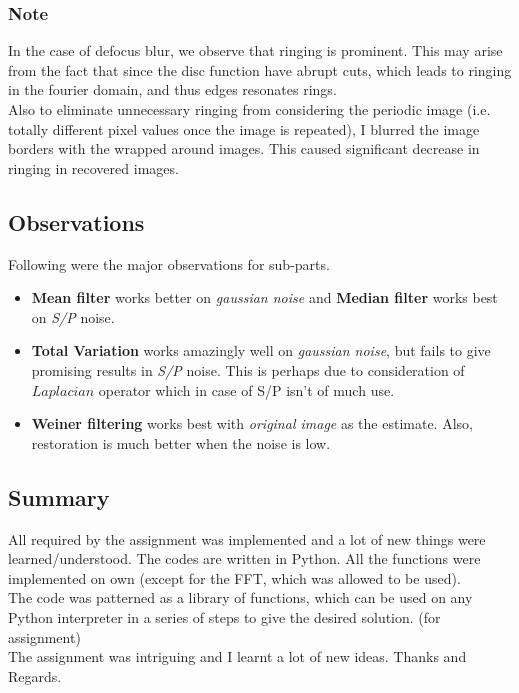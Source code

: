 \documentclass{article}
\begin{document}
    \subsubsection*{Note}
    In the case of defocus blur, we observe that ringing is prominent. This may arise from the fact that since the disc function have abrupt cuts, which leads to ringing in the fourier domain, and thus edges resonates rings.\\
    Also to eliminate unnecessary ringing from considering the periodic image (i.e. totally different pixel values once the image is repeated), I blurred the image borders with the wrapped around images. This caused significant decrease in ringing in recovered images.
    \pagebreak

    \subsection*{Observations}
    Following were the major observations for sub-parts.
    \begin{itemize}[topsep=0cm]
        \item \textbf{Mean filter} works better on \textit{gaussian noise} and \textbf{Median filter} works best on \textit{S/P} noise.
        \item \textbf{Total Variation} works amazingly well on \textit{gaussian noise}, but fails to give promising results in \textit{S/P} noise. This is perhaps due to consideration of \(Laplacian\) operator which in case of S/P isn't of much use.
        \item \textbf{Weiner filtering} works best with \textit{original image} as the estimate. Also, restoration is much better when the noise is low.
    \end{itemize}

    \subsection*{Summary}
    All required by the assignment was implemented and a lot of new things were learned/understood. The codes are written in Python. All the functions were implemented on own (except for the FFT, which was allowed to be used). \\
    The code was patterned as a library of functions, which can be used on any Python interpreter in a series of steps to give the desired solution. (for assignment)\\
    The assignment was intriguing and I learnt a lot of new ideas. Thanks and Regards.
    
\end{document}
